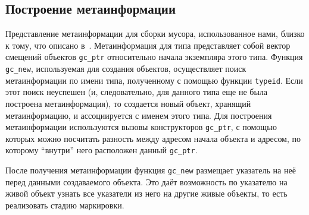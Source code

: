 \subsection{Построение метаинформации}

Представление метаинформации для сборки мусора, использованное нами, близко к тому, что описано
в~\cite{meta}. Метаинформация для типа представляет собой вектор смещений объектов \lstinline{gc_ptr} 
относительно начала экземпляра этого типа. Функция \lstinline{gc_new}, используемая для создания объектов, 
осуществляет поиск метаинформации по имени типа, полученному с помощью функции \lstinline{typeid}. 
Если этот поиск неуспешен (и, следовательно, для данного типа еще не была построена метаинформация), 
то создается новый объект, хранящий метаинформацию, и ассоциируется с именем этого типа. Для построения
метаинформации используются вызовы конструкторов \lstinline{gc_ptr}, с помощью которых можно
посчитать разность между адресом начала объекта и адресом, по которому ``внутри'' него расположен данный
\lstinline{gc_ptr}. 

После получения метаинформации функция \lstinline{gc_new} размещает указатель на неё перед данными 
создаваемого объекта. Это даёт возможность по указателю на живой объект узнать все указатели
из него на другие живые объекты, то есть реализовать стадию маркировки.
